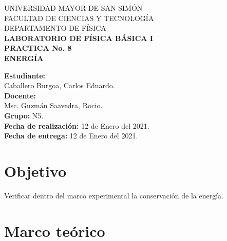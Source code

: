 \documentclass[letter,11pt]{article}
\newcommand{\blankpage}{
\newpage
\thispagestyle{empty}
\mbox{}
\newpage
}
\begin{document}
\begin{titlepage}
\begin{center}
{\Large UNIVERSIDAD MAYOR DE SAN SIMÓN}\\
\vspace*{0.15cm}
{\large FACULTAD DE CIENCIAS Y TECNOLOGÍA}\\
\vspace*{0.10cm}
DEPARTAMENTO DE FÍSICA\\
\vspace*{3.0cm}
{\Large \textbf{LABORATORIO DE FÍSICA BÁSICA I}}\\
\vspace*{0.3cm}
{\Large \textbf{PRACTICA No. 8}}\\
\vspace*{3.5cm}
{\Large \textbf{ENERGÍA}}\\
\end{center}

\vspace*{7.4cm}
\leftskip=7.95cm
\noindent
\textbf{Estudiante:}\\
Caballero Burgoa, Carlos Eduardo.\\
\newline
\textbf{Docente:}\\
Msc. Guzmán Saavedra, Rocio.\\
\newline
\textbf{Grupo:} N5.\\
\textbf{Fecha de realización:} 12 de Enero del 2021.\\
\textbf{Fecha de entrega:} 12 de Enero del 2021.\\

\end{titlepage}

\blankpage

\section{Objetivo}
Verificar dentro del marco experimental la conservación de la energía.

\section{Marco teórico}
\end{document}
